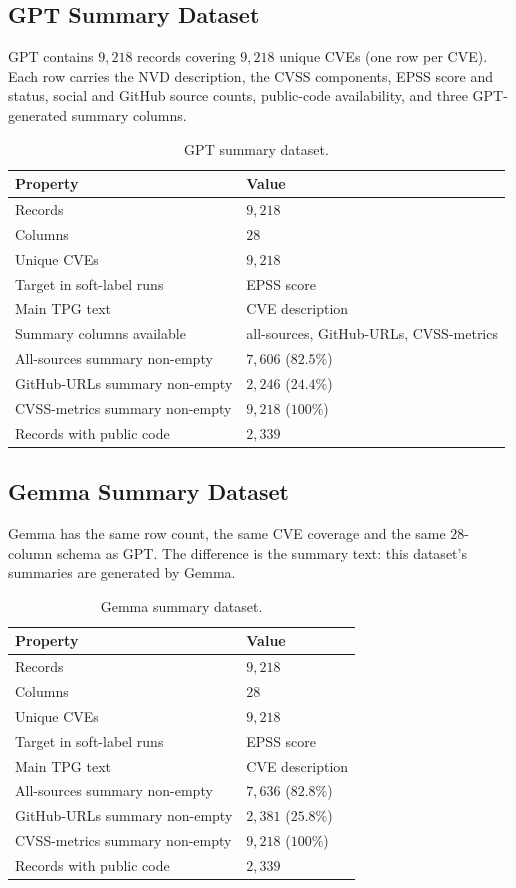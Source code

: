 \documentclass[11pt]{article}
\begin{document}
\subsection{GPT Summary Dataset}

GPT contains $9{,}218$ records covering $9{,}218$ unique CVEs (one row
per CVE). Each row carries the NVD description, the CVSS components,
EPSS score and status, social and GitHub source counts, public-code
availability, and three GPT-generated summary columns.

\begin{table}[h]
\centering
\small
\begin{tabular}{ll}
\toprule
Property & Value \\
\midrule
Records & $9{,}218$ \\
Columns & $28$ \\
Unique CVEs & $9{,}218$ \\
Target in soft-label runs & EPSS score \\
Main TPG text & CVE description \\
Summary columns available & all-sources, GitHub-URLs, CVSS-metrics \\
All-sources summary non-empty & $7{,}606$ ($82.5\%$) \\
GitHub-URLs summary non-empty & $2{,}246$ ($24.4\%$) \\
CVSS-metrics summary non-empty & $9{,}218$ ($100\%$) \\
Records with public code & $2{,}339$ \\
\bottomrule
\end{tabular}
\caption{GPT summary dataset.}
\end{table}

\subsection{Gemma Summary Dataset}

Gemma has the same row count, the same CVE coverage and the same
$28$-column schema as GPT. The difference is the summary text: this
dataset's summaries are generated by Gemma.

\begin{table}[h]
\centering
\small
\begin{tabular}{ll}
\toprule
Property & Value \\
\midrule
Records & $9{,}218$ \\
Columns & $28$ \\
Unique CVEs & $9{,}218$ \\
Target in soft-label runs & EPSS score \\
Main TPG text & CVE description \\
All-sources summary non-empty & $7{,}636$ ($82.8\%$) \\
GitHub-URLs summary non-empty & $2{,}381$ ($25.8\%$) \\
CVSS-metrics summary non-empty & $9{,}218$ ($100\%$) \\
Records with public code & $2{,}339$ \\
\bottomrule
\end{tabular}
\caption{Gemma summary dataset.}
\end{table}
\end{document}
